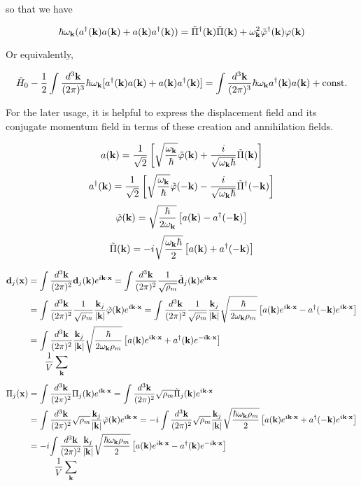 so that we have

\[\hbar\omega_{\bf k}(a^\dagger({\bf k})a({\bf k}) + a({\bf k})a^\dagger({\bf k})) = \tilde\Pi^\dagger({\bf k})\tilde\Pi({\bf k}) + \omega_{\bf k}^2\tilde\varphi^\dagger({\bf k})\varphi({\bf k}) \]

Or equivalently, 

\[\hat{H}_0 - \frac{1}{2}\int\frac{d^3\bf k}{(2\pi)^3}\hbar\omega_{\bf k}[a^\dagger({\bf k})a({\bf k}) + a({\bf k})a^\dagger({\bf k})] = \int\frac{d^3\bf k}{(2\pi)^3}\hbar\omega_{\bf k}a^\dagger({\bf k})a({\bf k}) + \text{const.} \]

For the later usage, it is helpful to express the displacement field and its conjugate momentum field in terms of these creation and annihilation fields. 

\[a({\bf k}) = \frac{1}{\sqrt{2}}\left[\sqrt{\frac{\omega_{\bf k}}{\hbar}}\tilde\varphi({\bf k}) + \frac{i}{\sqrt{\omega_{\bf k}\hbar}}\tilde\Pi({\bf k})\right] \]
\[a^\dagger({\bf k}) = \frac{1}{\sqrt{2}}\left[\sqrt{\frac{\omega_{\bf k}}{\hbar}}\tilde\varphi({\bf -k}) - \frac{i}{\sqrt{\omega_{\bf k}\hbar}}\tilde\Pi^\dagger({\bf -k})\right] \]
\[\tilde\varphi({\bf k}) = \sqrt{\frac{\hbar}{2\omega_{\bf k}}}\left[a({\bf k}) - a^\dagger({-\bf k})\right] \]
\[\tilde\Pi({\bf k}) = -i\sqrt{\frac{\omega_{\bf k}\hbar}{2}}\left[a({\bf k}) + a^\dagger({-\bf k})\right] \]

\[\begin{split}
{\bf d}_j({\bf x}) &= \int\frac{d^3\bf k}{(2\pi)^2} {\bf d}_j({\bf k})e^{i\bf k\cdot x} = \int\frac{d^3\bf k}{(2\pi)^2}\frac{1}{\sqrt{\rho_m}}\tilde{\bf d}_j({\bf k})e^{i\bf k\cdot x}\\
&=\int\frac{d^3\bf k}{(2\pi)^2}\frac{1}{\sqrt{\rho_m}}\frac{{\bf k}_j}{|{\bf k}|}\tilde\varphi({\bf k})e^{i\bf k\cdot x} = \int\frac{d^3\bf k}{(2\pi)^2}\frac{1}{\sqrt{\rho_m}}\frac{{\bf k}_j}{|{\bf k}|}\sqrt{\frac{\hbar}{2\omega_{\bf k}\rho_m}}\left[a({\bf k})e^{i\bf k\cdot x}-a^\dagger(-{\bf k})e^{i\bf k\cdot x}\right]\\
&=\underset{\displaystyle\frac{1}{V}\sum_{\bf k}}{\int\frac{d^3\bf k}{(2\pi)^2}}\frac{{\bf k}_j}{|{\bf k}|}\sqrt{\frac{\hbar}{2\omega_{\bf k}\rho_m}}\left[a({\bf k})e^{i\bf k\cdot x}+a^\dagger({\bf k})e^{-i\bf k\cdot x}\right]
\end{split}\]
\[\begin{split}
\Pi_j({\bf x}) &= \int\frac{d^3\bf k}{(2\pi)^2} {\Pi}_j({\bf k})e^{i\bf k\cdot x} = \int\frac{d^3\bf k}{(2\pi)^2}\sqrt{\rho_m}\tilde{\Pi}_j({\bf k})e^{i\bf k\cdot x}\\
&=\int\frac{d^3\bf k}{(2\pi)^2}\sqrt{\rho_m}\frac{{\bf k}_j}{|{\bf k}|}\tilde\varphi({\bf k})e^{i\bf k\cdot x} = -i\int\frac{d^3\bf k}{(2\pi)^2}\sqrt{\rho_m}\frac{{\bf k}_j}{|{\bf k}|}\sqrt{\frac{\hbar\omega_{\bf k}\rho_m}{2}}\left[a({\bf k})e^{i\bf k\cdot x}+a^\dagger(-{\bf k})e^{i\bf k\cdot x}\right]\\
&=-i\underset{\displaystyle\frac{1}{V}\sum_{\bf k}}{\int\frac{d^3\bf k}{(2\pi)^2}}\frac{{\bf k}_j}{|{\bf k}|}\sqrt{\frac{\hbar\omega_{\bf k}\rho_m}{2}}\left[a({\bf k})e^{i\bf k\cdot x}-a^\dagger({\bf k})e^{-i\bf k\cdot x}\right]
\end{split}\]

